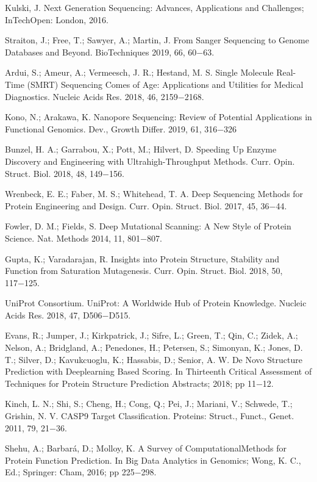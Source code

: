 \documentclass[12pt]{article}
\begin{document}
\begin{thebibliography}{20}
 Kulski, J. Next Generation Sequencing: Advances, Applications and Challenges; InTechOpen: London, 2016.

 Straiton, J.; Free, T.; Sawyer, A.; Martin, J. From Sanger Sequencing to Genome Databases and Beyond. BioTechniques 2019, 66, 60−63.

 Ardui, S.; Ameur, A.; Vermeesch, J. R.; Hestand, M. S. Single Molecule Real-Time (SMRT) Sequencing Comes of Age: Applications and Utilities for Medical Diagnostics. Nucleic Acids Res. 2018, 46, 2159−2168.

 Kono, N.; Arakawa, K. Nanopore Sequencing: Review of Potential Applications in Functional Genomics. Dev., Growth Differ. 2019, 61, 316−326

 Bunzel, H. A.; Garrabou, X.; Pott, M.; Hilvert, D. Speeding Up Enzyme Discovery and Engineering with Ultrahigh-Throughput Methods. Curr. Opin. Struct. Biol. 2018, 48, 149−156.

 Wrenbeck, E. E.; Faber, M. S.; Whitehead, T. A. Deep Sequencing Methods for Protein Engineering and Design. Curr. Opin. Struct. Biol. 2017, 45, 36−44.

 Fowler, D. M.; Fields, S. Deep Mutational Scanning: A New Style of Protein Science. Nat. Methods 2014, 11, 801−807.

 Gupta, K.; Varadarajan, R. Insights into Protein Structure, Stability and Function from Saturation Mutagenesis. Curr. Opin. Struct. Biol. 2018, 50, 117−125.

 UniProt Consortium. UniProt: A Worldwide Hub of Protein Knowledge. Nucleic Acids Res. 2018, 47, D506−D515.

 Evans, R.; Jumper, J.; Kirkpatrick, J.; Sifre, L.; Green, T.; Qin, C.; Zidek, A.; Nelson, A.; Bridgland, A.; Penedones, H.; Petersen, S.; Simonyan, K.; Jones, D. T.; Silver, D.; Kavukcuoglu, K.; Hassabis, D.; Senior, A. W. De Novo Structure Prediction with Deeplearning Based Scoring. In Thirteenth Critical Assessment of Techniques for Protein Structure Prediction Abstracts; 2018; pp 11−12.

 Kinch, L. N.; Shi, S.; Cheng, H.; Cong, Q.; Pei, J.; Mariani, V.; Schwede, T.; Grishin, N. V. CASP9 Target Classification. Proteins: Struct., Funct., Genet. 2011, 79, 21−36.

 Shehu, A.; Barbará, D.; Molloy, K. A Survey of ComputationalMethods for Protein Function Prediction. In Big Data Analytics in Genomics; Wong, K. C., Ed.; Springer: Cham, 2016; pp 225−298.


\end{thebibliography}
\end{document}
